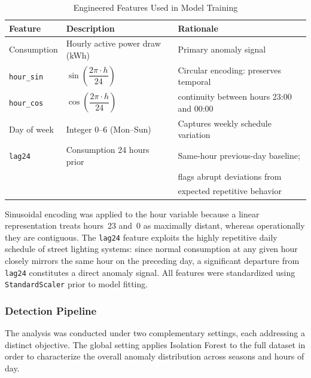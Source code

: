\documentclass{article}
\begin{document}
\begin{table}[h]
\centering
\caption{Engineered Features Used in Model Training}
\label{tab:features}
\begin{tabular}{p{3.2cm}p{4.5cm}p{5.5cm}}
\hline
\textbf{Feature} & \textbf{Description} & \textbf{Rationale} \\
\hline
Consumption        & Hourly active power draw (kWh) & Primary anomaly signal \\
\texttt{hour\_sin} & $\sin\!\left(\dfrac{2\pi \cdot h}{24}\right)$ &
  Circular encoding: preserves temporal \\
\texttt{hour\_cos} & $\cos\!\left(\dfrac{2\pi \cdot h}{24}\right)$ &
  continuity between hours 23:00 and 00:00 \\
Day of week        & Integer 0--6 (Mon--Sun) & Captures weekly schedule variation \\
\texttt{lag24}     & Consumption 24 hours prior & Same-hour previous-day baseline; \\
                   &                            & flags abrupt deviations from \\
                   &                            & expected repetitive behavior \\
\hline
\end{tabular}
\end{table}

Sinusoidal encoding was applied to the hour variable because a linear
representation treats hours~23 and~0 as maximally distant, whereas
operationally they are contiguous. The \texttt{lag24} feature exploits
the highly repetitive daily schedule of street lighting systems: since
normal consumption at any given hour closely mirrors the same hour on
the preceding day, a significant departure from \texttt{lag24}
constitutes a direct anomaly signal. All features were standardized
using \texttt{StandardScaler} prior to model fitting.

\subsubsection{Detection Pipeline}

The analysis was conducted under two complementary settings, each
addressing a distinct objective. The global setting applies Isolation
Forest to the full dataset in order to characterize the overall anomaly
distribution across seasons and hours of day. 
\end{document}
